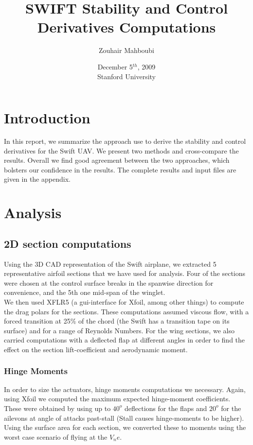 \documentclass[titlepage,10pt]{article}
\begin{document}
\title{
SWIFT Stability and Control Derivatives Computations \\
}

\author{Zouhair Mahboubi}

\date{December 5$^{th}$, 2009\\ Stanford University}

\maketitle
\newpage

\section{Introduction}
In this report, we summarize the approach use to derive the stability and control derivatives for the Swift UAV. We present two methods and cross-compare the results. Overall we find good agreement between the two approaches, which bolsters our confidence in the results. The complete results and input files are given in the appendix.


\section{Analysis}
\subsection{2D section computations}
Using the 3D CAD representation of the Swift airplane, we extracted 5 representative airfoil sections that we have used for analysis. Four of the sections were chosen at the control surface breaks in the spanwise direction for convenience, and the 5th one mid-span of the winglet.\\
We then used XFLR5 (a gui-interface for Xfoil, among other things) to compute the drag polars for the sections. These computations assumed viscous flow, with a forced transition at 25\% of the chord (the Swift has a transition tape on its  surface) and for a range of Reynolds Numbers. For the wing sections, we also carried computations with a deflected flap at different angles in order to find the effect on the section lift-coefficient and aerodynamic moment.

\subsubsection{Hinge Moments}
In order to size the actuators, hinge moments computations we necessary. Again, using Xfoil we computed the maximum expected hinge-moment coefficients. These were obtained by using up to $40^o$ deflections for the flaps and $20^o$ for the ailevons at angle of attacks past-stall (Stall causes hinge-moments to be higher). Using the surface area for each section, we converted these to moments using the worst case scenario of flying at the $V_ne$.
\end{document}
